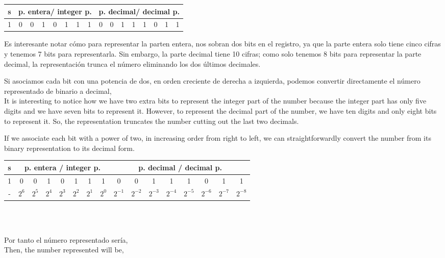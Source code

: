 \begin{minipage}{\textwidth}
\centering
\begin{tabular}{|c||c|c|c|c|c|c|c||c|c|c|c|c|c|c|c|}
\hline
s&\multicolumn{7}{c||}{p. entera/ integer p.}&\multicolumn{8}{c|}{p. decimal/ decimal p.}\\
\hline
1&0&0&1&0&1&1&1&0&0&1&1&1&0&1&1\\
\hline
\end{tabular}
\end{minipage}

\begin{paracol}{2}
Es interesante notar cómo para representar la parten entera, nos sobran dos bits en el registro, ya que la parte entera solo tiene cinco cifras y tenemos 7 bits para representarla. Sin embargo, la parte decimal tiene 10 cifras; como solo tenemos 8 bits para representar la parte decimal, la representación trunca el número eliminando los dos últimos decimales.

Si asociamos cada bit con una potencia de dos, en orden creciente de derecha a izquierda, podemos convertir directamente el número representado de binario a decimal,\\
\switchcolumn
It is interesting to notice how we have two extra bits to represent the integer part of the number because the integer part has only five digits and we have seven bits to represent it. However, to represent the decimal part of the number, we have ten digits and only eight bits to represent it. So, the representation truncates the number cutting out the last two decimals.

If we associate each bit with a power of two, in increasing order from right to left, we can straightforwardly convert the number from its binary representation to its decimal form.
\end{paracol}

\begin{tabular}{|c||c|c|c|c|c|c|c||c|c|c|c|c|c|c|c|}
\hline
s&\multicolumn{7}{c||}{p. entera / integer p.}&\multicolumn{8}{c|}{p. decimal / decimal p. }\\
\hline
1&0&0&1&0&1&1&1&0&0&1&1&1&0&1&1\\
\hline
-&$2^{6}$&$2^{5}$&$2^{4}$&$2^{3}$&$2^{2}$&$2^{1}$&$2^{0}$&$2^{-1}$&$2^{-2}$&$2^{-3}$&$2^{-4}$&$2^{-5}$&$2^{-6}$&$2^{-7}$&$2^{-8}$\\
\hline
\end{tabular}\\

\begin{paracol}{2}
\ \\
Por tanto el número representado sería,
\switchcolumn
\ \\
Then, the number represented will be,
\end{paracol}

